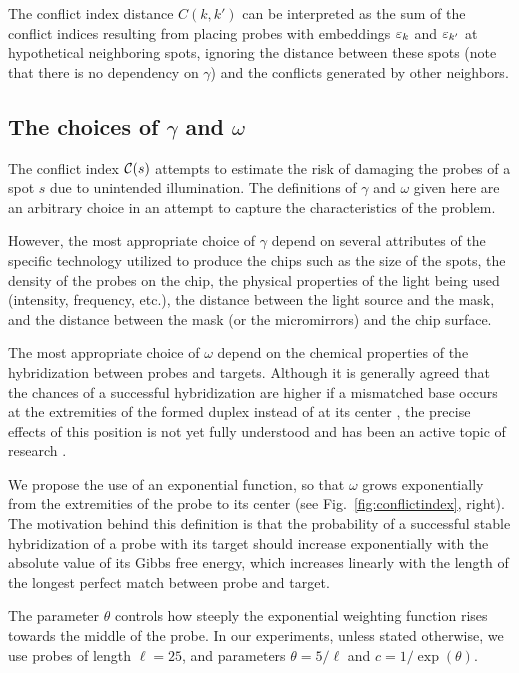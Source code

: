 The conflict index distance $C(k,k')$ can be interpreted as the sum of the
conflict indices resulting from placing probes with embeddings $\varepsilon_k$ and
$\varepsilon_{k'}$ at hypothetical neighboring spots, ignoring the distance between
these spots (note that there is no dependency on $\gamma$) and the conflicts
generated by other neighbors.

\subsection{The choices of $\gamma$ and $\omega$}

The conflict index ${\mathcal{C}}(s)$ attempts to estimate the risk of damaging the
probes of a spot $s$ due to unintended illumination. The definitions of $\gamma$
and $\omega$ given here are an arbitrary choice in an attempt to capture the
characteristics of the problem.

However, the most appropriate choice of $\gamma$ depend on several attributes of
the specific technology utilized to produce the chips such as the size of the
spots, the density of the probes on the chip, the physical properties of the
light being used (intensity, frequency, etc.), the distance between the light
source and the mask, and the distance between the mask (or the micromirrors) and
the chip surface.

The most appropriate choice of $\omega$ depend on the chemical properties of the
hybridization between probes and targets. Although it is generally agreed that
the chances of a successful hybridization are higher if a mismatched base occurs
at the extremities of the formed duplex instead of at its center
\citep{Hubbell1999}, the precise effects of this position is not yet fully
understood and has been an active topic of research \citep{Binder2005}.

We propose the use of an exponential function, so that $\omega$ grows
exponentially from the extremities of the probe to its center (see
Fig.~\ref{fig:conflictindex}, right). The motivation behind this definition is
that the probability of a successful stable hybridization of a probe with its
target should increase exponentially with the absolute value of its Gibbs free
energy, which increases linearly with the length of the longest perfect match
between probe and target.

The parameter $\theta$ controls how steeply the exponential weighting function
rises towards the middle of the probe. In our experiments, unless stated
otherwise, we use probes of length $\ell=25$, and parameters $\theta = 5/\ell$
and $c = 1/\exp{(\theta)}$.

